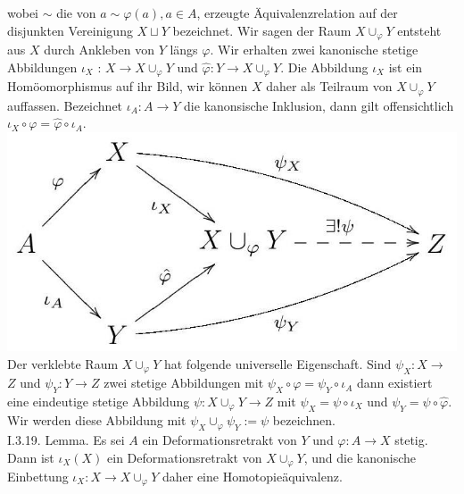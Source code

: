 \documentclass[10pt]{article}
\begin{document}
wobei $\sim$ die von $a \sim \varphi(a), a \in A$, erzeugte Äquivalenzrelation auf der disjunkten Vereinigung $X \sqcup Y$ bezeichnet. Wir sagen der Raum $X \cup_{\varphi} Y$ entsteht aus $X$ durch Ankleben von $Y$ längs $\varphi$. Wir erhalten zwei kanonische stetige Abbildungen $\iota_{X}$ : $X \rightarrow X \cup_{\varphi} Y$ und $\hat{\varphi}: Y \rightarrow X \cup_{\varphi} Y$. Die Abbildung $\iota_{X}$ ist ein Homöomorphismus auf ihr Bild, wir können $X$ daher als Teilraum von $X \cup_{\varphi} Y$ auffassen. Bezeichnet $\iota_{A}: A \rightarrow Y$ die kanonsische Inklusion, dann gilt offensichtlich $\iota_{X} \circ \varphi=\hat{\varphi} \circ \iota_{A}$.\\
\includegraphics[max width=\textwidth]{2025_06_05_d7ed2bacd1e9ce1db1f0g-027} Der verklebte Raum $X \cup_{\varphi} Y$ hat folgende universelle Eigenschaft. Sind $\psi_{X}: X \rightarrow$ $Z$ und $\psi_{Y}: Y \rightarrow Z$ zwei stetige Abbildungen mit $\psi_{X} \circ \varphi=\psi_{Y} \circ \iota_{A}$ dann existiert eine eindeutige stetige Abbildung $\psi: X \cup_{\varphi} Y \rightarrow Z$ mit $\psi_{X}=\psi \circ \iota_{X}$ und $\psi_{Y}=\psi \circ \hat{\varphi}$. Wir werden diese Abbildung mit $\psi_{X} \cup_{\varphi} \psi_{Y}:=\psi$ bezeichnen.\\
I.3.19. Lemma. Es sei $A$ ein Deformationsretrakt von $Y$ und $\varphi: A \rightarrow X$ stetig. Dann ist $\iota_{X}(X)$ ein Deformationsretrakt von $X \cup_{\varphi} Y$, und die kanonische Einbettung $\iota_{X}: X \rightarrow X \cup_{\varphi} Y$ daher eine Homotopieäquivalenz.
\end{document}
